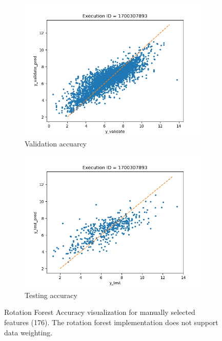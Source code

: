 \documentclass[11pt]{article}
\begin{document}
\begin{figure}
     \centering
     \begin{subfigure}[b]{0.45\textwidth}
         \centering
         \includegraphics[scale=0.45]{images/accuracyRotationFRvalidate}
         \caption{Validation accuarcy}
        \label{fig:accuracyRotationFRvalidate}
     \end{subfigure}
     \hfill
     \begin{subfigure}[b]{0.45\textwidth}
         \centering
         \includegraphics[scale=0.45]{images/accuracyRotationFRtest}
        \caption{Testing accuracy}
        \label{fig:accuracyRotationFRtest}
     \end{subfigure}
     \caption{Rotation Forest Accuracy visualization for manually selected features (176).  The rotation forest implementation does not support data weighting.}
     \label{fig:RotationForestAccuracy}
\end{figure}
\end{document}
